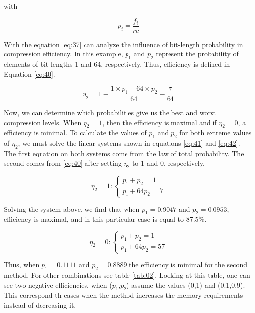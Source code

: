 \documentclass[10pt]{article}
\begin{document}
\noindent with

\begin{equation}\label{eq:38}
 p_i = \frac{f_i}{rc}
\end{equation}

With the equation \ref{eq:37} can analyze the influence of bit-length probability in compression efficiency. In this example, $p_1$ and $p_2$ represent the probability of elements of bit-lengths 1 and 64, respectively. Thus, efficiency is defined in Equation \ref{eq:40}.

\begin{equation}\label{eq:40}
 \eta_2 = 1 - \frac{1 \times p_1  + 64 \times p_2}{64} - \frac{7}{64} 
\end{equation}

Now, we can determine which probabilities give us the best and worst compression levels. When $\eta_2=1$, then the efficiency is maximal and if $\eta_2=0$, a efficiency is minimal. To calculate the values ​​of $p_1$ and $p_2$ for both extreme values of $\eta_2$,  we must solve the linear systems shown in equations \ref{eq:41} and \ref{eq:42}. The first equation on both systems come from the law of total probability. The second comes from \ref{eq:40} after setting $\eta_2$ to $1$ and $0$, respectively.

\begin{equation}\label{eq:41}
  \eta_2 = 1 :\left
  \{\begin{matrix}
    p_1 + p_2 = 1\\ 
    p_1+64p_2 = 7
  \end{matrix}
  \right.
\end{equation}

Solving the system above, we find that  when $p_1=0.9047$ and $p_2=0.0953$, efficiency is maximal, and in this particular case is equal to 87.5\%. 

\begin{equation}\label{eq:42}
  \eta_2 = 0 :\left
  \{\begin{matrix}
    p_1 + p_2 = 1\\ 
    p_1+64p_2 = 57
  \end{matrix}
  \right.
\end{equation}

Thus, when $p_1=0.1111$ and $p_2=0.8889$ the efficiency is minimal for the second method. For other combinations see table \ref{tab:02}. Looking at this table, one can see two negative efficiencies, when ($p_1$,$p_2$) assume the values ​​(0,1) and (0.1,0.9). This correspond th cases when the method increases the memory requirements instead of decreasing it.
\end{document}
